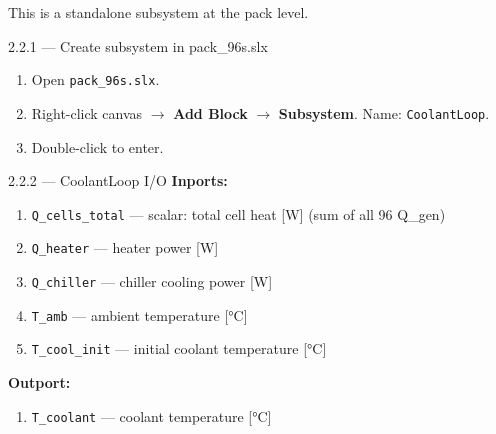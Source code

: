 \documentclass[11pt,a4paper]{article}
\begin{document}
This is a standalone subsystem at the pack level.

\begin{guistep}{2.2.1 — Create subsystem in pack\_96s.slx}
\begin{enumerate}
    \item Open \texttt{pack\_96s.slx}.
    \item Right-click canvas $\to$ \textbf{Add Block} $\to$ \textbf{Subsystem}. Name: \texttt{CoolantLoop}.
    \item Double-click to enter.
\end{enumerate}
\end{guistep}

\begin{guistep}{2.2.2 — CoolantLoop I/O}
\textbf{Inports:}
\begin{enumerate}
    \item \texttt{Q\_cells\_total} — scalar: total cell heat [W] (sum of all 96 Q\_gen)
    \item \texttt{Q\_heater} — heater power [W]
    \item \texttt{Q\_chiller} — chiller cooling power [W]
    \item \texttt{T\_amb} — ambient temperature [\si{\degreeCelsius}]
    \item \texttt{T\_cool\_init} — initial coolant temperature [\si{\degreeCelsius}]
\end{enumerate}
\textbf{Outport:}
\begin{enumerate}
    \item \texttt{T\_coolant} — coolant temperature [\si{\degreeCelsius}]
\end{enumerate}
\end{guistep}
\end{document}
